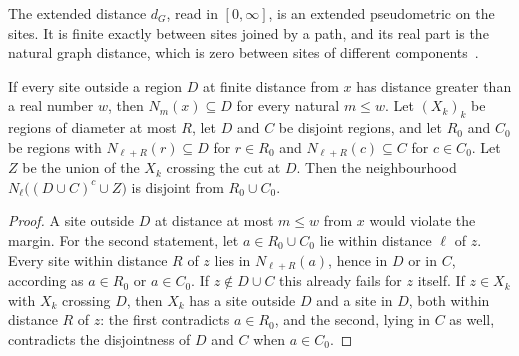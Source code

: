 \begin{definition}
    \label{def:dynamics_graph_pseudometric}
    \leanok
    The extended distance $d_G$, read in $[0,\infty]$, is an extended
    pseudometric on the sites. It is finite exactly between sites joined by a
    path, and its real part is the natural graph distance, which is zero
    between sites of different components~\cite{OpenAI2026AreaLaw}.
\end{definition}

\begin{lemma}
    \label{lem:dynamics_support_separation}
    \leanok
    If every site outside a region $D$ at finite distance from $x$ has
    distance greater than a real number $w$, then $N_m(x)\subseteq D$ for every
    natural $m\leq w$.
    Let $(X_k)_k$ be regions of diameter at most $R$, let $D$ and $C$ be
    disjoint regions, and let $R_0$ and $C_0$ be regions with
    $N_{\ell+R}(r)\subseteq D$ for $r\in R_0$ and $N_{\ell+R}(c)\subseteq C$
    for $c\in C_0$. Let $Z$ be the union of the $X_k$ crossing the cut at $D$.
    Then the neighbourhood $N_\ell\bigl((D\cup C)^c\cup Z\bigr)$ is disjoint
    from $R_0\cup C_0$.
\end{lemma}
\begin{proof}\leanok
    A site outside $D$ at distance at most $m\leq w$ from $x$ would violate the
    margin. For the second statement, let $a\in R_0\cup C_0$ lie within
    distance $\ell$ of $z$. Every site within distance $R$ of $z$ lies in
    $N_{\ell+R}(a)$, hence in $D$ or in $C$, according as $a\in R_0$ or
    $a\in C_0$. If $z\notin D\cup C$ this already fails for $z$ itself. If
    $z\in X_k$ with $X_k$ crossing $D$, then $X_k$ has a site outside $D$ and a
    site in $D$, both within distance $R$ of $z$: the first contradicts
    $a\in R_0$, and the second, lying in $C$ as well, contradicts the
    disjointness of $D$ and $C$ when $a\in C_0$.
\end{proof}

